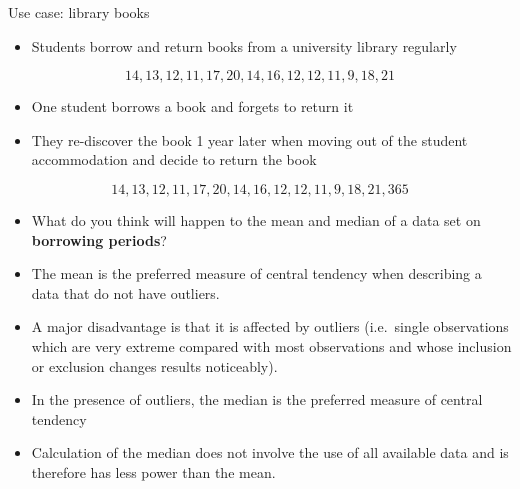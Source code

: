 \documentclass[
  ignorenonframetext,
  aspectratio=169]{beamer}
\providecommand{\tightlist}{%
  \setlength{\itemsep}{0pt}\setlength{\parskip}{0pt}}
\begin{document}
\begin{frame}{Use case: library books}
\protect\hypertarget{use-case-library-books}{}
\begin{itemize}
\tightlist
\item
  Students borrow and return books from a university library regularly
\end{itemize}

\[
14, 13, 12, 11, 17, 20, 14, 16, 12, 12, 11, 9, 18, 21
\]

\begin{itemize}
\tightlist
\item
  One student borrows a book and forgets to return it
\item
  They re-discover the book 1 year later when moving out of the student
  accommodation and decide to return the book
\end{itemize}

\[
14, 13, 12, 11, 17, 20, 14, 16, 12, 12, 11, 9, 18, 21, 365
\]

\begin{itemize}
\tightlist
\item
  What do you think will happen to the mean and median of a data set on
  \textbf{borrowing periods}?
\end{itemize}
\end{frame}

\begin{frame}{}
\protect\hypertarget{section-2}{}
\begin{itemize}
\tightlist
\item
  The mean is the preferred measure of central tendency when describing
  a data that do not have outliers.
\item
  A major disadvantage is that it is affected by outliers (i.e.~single
  observations which are very extreme compared with most observations
  and whose inclusion or exclusion changes results noticeably).
\item
  In the presence of outliers, the median is the preferred measure of
  central tendency
\item
  Calculation of the median does not involve the use of all available
  data and is therefore has less power than the mean.
\end{itemize}
\end{frame}
\end{document}
